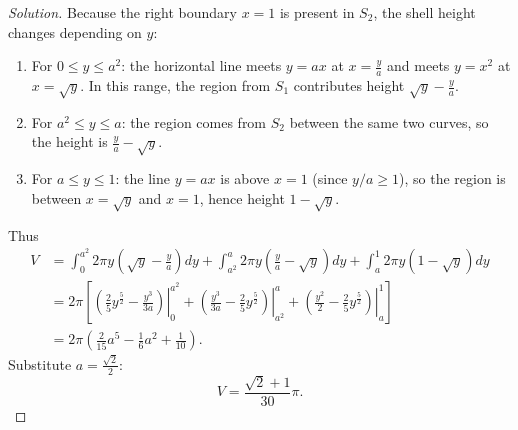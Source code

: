 \documentclass[11pt]{article}
\theoremstyle{definition}
\newenvironment{solution}{\begin{proof}[Solution]}{\end{proof}}
\begin{document}
\begin{solution}
Because the right boundary $x=1$ is present in $S_2$, the shell height changes depending on $y$:
\begin{enumerate}
  \item For $0\le y\le a^{2}$: the horizontal line meets $y=ax$ at $x=\frac{y}{a}$ and meets $y=x^{2}$ at $x=\sqrt{y}$. In this range, the region from $S_1$ contributes height $\sqrt{y}-\frac{y}{a}$.
  \item For $a^{2}\le y\le a$: the region comes from $S_2$ between the same two curves, so the height is $\frac{y}{a}-\sqrt{y}$.
  \item For $a\le y\le 1$: the line $y=ax$ is above $x=1$ (since $y/a\ge 1$), so the region is between $x=\sqrt{y}$ and $x=1$, hence height $1-\sqrt{y}$.
\end{enumerate}
Thus
\begin{align*}
V
&=\int_{0}^{a^{2}}2\pi y\left(\sqrt{y}-\frac{y}{a}\right)dy
 +\int_{a^{2}}^{a}2\pi y\left(\frac{y}{a}-\sqrt{y}\right)dy
 +\int_{a}^{1}2\pi y(1-\sqrt{y})dy \\
&=2\pi\left[\left.\left(\frac{2}{5}y^{\frac{5}{2}}-\frac{y^{3}}{3a}\right)\right|_{0}^{a^{2}}
 +\left.\left(\frac{y^{3}}{3a}-\frac{2}{5}y^{\frac{5}{2}}\right)\right|_{a^{2}}^{a}
 +\left.\left(\frac{y^{2}}{2}-\frac{2}{5}y^{\frac{5}{2}}\right)\right|_{a}^{1}\right] \\
&=2\pi\left(\frac{2}{15}a^{5}-\frac{1}{6}a^{2}+\frac{1}{10}\right).
\end{align*}
Substitute $a=\frac{\sqrt{2}}{2}$:
\[
V=\frac{\sqrt{2}+1}{30}\pi.
\]
\end{solution}
\end{document}
